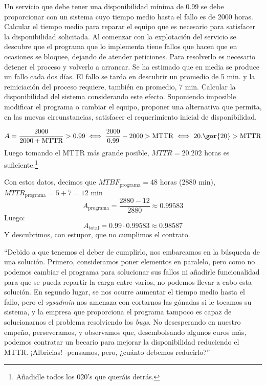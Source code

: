 \begin{problem}[6]
Un servicio que debe tener una disponibilidad mínima de 0.99 se debe proporcionar con un sistema cuyo tiempo medio hasta el fallo es de 2000 horas.
\ppart
Calcular el tiempo medio para reparar el equipo que es necesario para satisfacer la disponibilidad solicitada.
\ppart
Al comenzar con la explotación del servicio se descubre que el programa que lo implementa tiene fallos que hacen que en ocasiones se bloquee, dejando de atender peticiones. Para resolverlo es necesario detener el proceso y volverlo a arrancar. Se ha estimado que en media se produce un fallo cada dos días. El fallo se tarda en descubrir un promedio de 5 min. y la reiniciación del proceso requiere, también en promedio, 7 min. Calcular la disponibilidad del sistema considerando este efecto.
\ppart
Suponiendo imposible modificar el programa o cambiar el equipo, proponer una alternativa que permita, en las nuevas circunstancias, satisfacer el requerimiento inicial de disponibilidad.

\solution

\spart
\[ A = \frac{2000}{2000+\text{MTTR}} > 0.99 \iff \frac{2000}{0.99} - 2000 > \text{MTTR} \iff 20.\gor{20} > \text{MTTR} \]
Luego tomando el MTTR más grande posible, $MTTR = 20.202$ horas es suficiente.\footnote{Añadidle todos los 020's que queráis detrás.}

\spart
Con estos datos, decimos que $MTBF_{\text{programa}} = 48$ horas (2880 min), $MTTR_{\text{programa}} = 5+7 = 12$ min
\[ A_{\text{programa}} = \frac{2880 - 12}{2880} \approx 0.99583\]
Luego:
\[ A_{\text{total}} = 0.99 \cdot 0.99583 \approx 0.98587 \]
Y descubrimos, con estupor, que no cumplimos el contrato.

\spart
``Debido a que tenemos el deber de cumplirlo, nos embarcamos en la búsqueda de una solución.
Primero, consideramos poner elementos en paralelo, pero como no podemos cambiar el programa para solucionar sus fallos ni añadirle funcionalidad para que se pueda repartir la carga entre varios, no podemos llevar a cabo esta solución. En segundo lugar, se nos ocurre aumentar el tiempo medio hasta el fallo, pero el \textit{sysadmin} nos amenaza con cortarnos las gónadas si le tocamos su sistema, y la empresa que proporciona el programa tampoco es capaz de solucionarnos el problema resolviendo los \textit{bugs}. No desesperando en nuestro empeño, perseveramos, y observamos que, desembolsando algunos euros más, podemos contratar un becario para mejorar la disponibilidad reduciendo el MTTR. ¡Albricias! -pensamos, pero, ¿cuánto debemos reducirlo?''\\


\end{problem}
